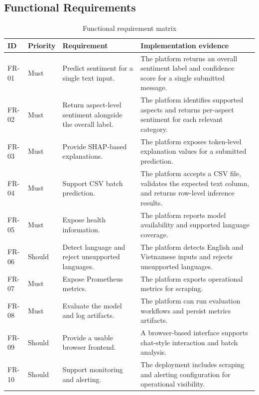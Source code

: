 \documentclass[12pt, a4paper]{article}
\begin{document}
\subsection{Functional Requirements}
\begin{table}[H]
\centering
\caption{Functional requirement matrix}
\begin{tabularx}{\textwidth}{@{} p{1.5cm} p{1.8cm} p{3.2cm} X @{}}
\toprule
\textbf{ID} & \textbf{Priority} & \textbf{Requirement} & \textbf{Implementation evidence} \\
\midrule
FR-01 & Must & Predict sentiment for a single text input. & The platform returns an overall sentiment label and confidence score for a single submitted message. \\
FR-02 & Must & Return aspect-level sentiment alongside the overall label. & The platform identifies supported aspects and returns per-aspect sentiment for each relevant category. \\
FR-03 & Must & Provide SHAP-based explanations. & The platform exposes token-level explanation values for a submitted prediction. \\
FR-04 & Must & Support CSV batch prediction. & The platform accepts a CSV file, validates the expected text column, and returns row-level inference results. \\
FR-05 & Must & Expose health information. & The platform reports model availability and supported language coverage. \\
FR-06 & Should & Detect language and reject unsupported languages. & The platform detects English and Vietnamese inputs and rejects unsupported languages. \\
FR-07 & Must & Expose Prometheus metrics. & The platform exports operational metrics for scraping. \\
FR-08 & Must & Evaluate the model and log artifacts. & The platform can run evaluation workflows and persist metrics artifacts. \\
FR-09 & Should & Provide a usable browser frontend. & A browser-based interface supports chat-style interaction and batch analysis. \\
FR-10 & Should & Support monitoring and alerting. & The deployment includes scraping and alerting configuration for operational visibility. \\
\bottomrule
\end{tabularx}
\end{table}
\end{document}
